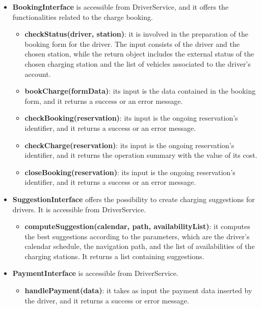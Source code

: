 \documentclass[../main.tex]{subfiles}
\begin{document}
\begin{itemize}
    \item \textbf{BookingInterface} is accessible from DriverService, and it offers the functionalities related to the charge booking. 
    \begin{itemize}
        \item \textbf{checkStatus(driver, station)}: it is involved in the preparation of the booking form for the driver. The input consists of the driver and the chosen station, while the return object includes the external status of the chosen charging station and the list of vehicles associated to the driver's account.
        \item \textbf{bookCharge(formData)}: its input is the data contained in the booking form, and it returns a success or an error message.
        \item \textbf{checkBooking(reservation)}: its input is the ongoing reservation's identifier, and it returns a success or an error message.
        \item \textbf{checkCharge(reservation)}: its input is the ongoing reservation's identifier, and it returns the operation summary with the value of its cost. 
        \item \textbf{closeBooking(reservation)}: its input is the ongoing reservation's identifier, and it returns a success or an error message.
    \end{itemize}

    \item \textbf{SuggestionInterface} offers the possibility to create charging suggestions for drivers. It is accessible from DriverService.
    \begin{itemize}
        \item \textbf{computeSuggestion(calendar, path, availabilityList)}: it computes the best suggestions according to the parameters, which are the driver's calendar schedule, the navigation path, and the list of availabilities of the charging stations. It returns a list containing suggestions.
    \end{itemize}

    \item \textbf{PaymentInterface} is accessible from DriverService.
    \begin{itemize}
        \item \textbf{handlePayment(data)}: it takes as input the payment data inserted by the driver, and it returns a success or error message.
    \end{itemize}


\end{itemize}
\end{document}
